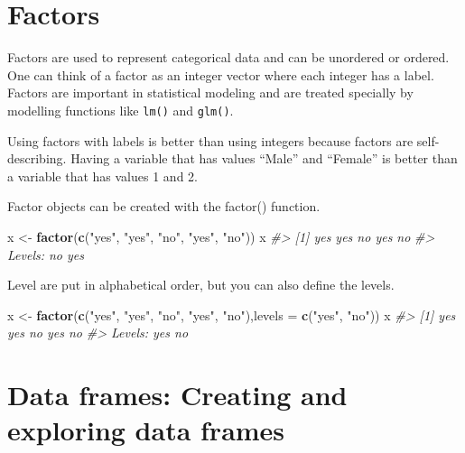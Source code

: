 \documentclass[
]{book}
\newenvironment{Shaded}{\begin{snugshade}}{\end{snugshade}}
\newcommand{\AttributeTok}[1]{\textcolor[rgb]{0.13,0.29,0.53}{#1}}
\newcommand{\CommentTok}[1]{\textcolor[rgb]{0.56,0.35,0.01}{\textit{#1}}}
\newcommand{\FunctionTok}[1]{\textcolor[rgb]{0.13,0.29,0.53}{\textbf{#1}}}
\newcommand{\NormalTok}[1]{#1}
\newcommand{\OtherTok}[1]{\textcolor[rgb]{0.56,0.35,0.01}{#1}}
\newcommand{\StringTok}[1]{\textcolor[rgb]{0.31,0.60,0.02}{#1}}
\begin{document}
\section*{Factors}\label{factors}

Factors are used to represent categorical data and can be unordered or ordered. One can think of a factor as an integer vector where each integer has a label. Factors are important in statistical modeling and are treated specially by modelling functions like \texttt{lm()} and \texttt{glm()}.

Using factors with labels is better than using integers because factors are self-describing. Having a variable that has values ``Male'' and ``Female'' is better than a variable that has values 1 and 2.

Factor objects can be created with the factor() function.

\begin{Shaded}
\begin{Highlighting}[]
\NormalTok{x }\OtherTok{\textless{}{-}} \FunctionTok{factor}\NormalTok{(}\FunctionTok{c}\NormalTok{(}\StringTok{"yes"}\NormalTok{, }\StringTok{"yes"}\NormalTok{, }\StringTok{"no"}\NormalTok{, }\StringTok{"yes"}\NormalTok{, }\StringTok{"no"}\NormalTok{)) }
\NormalTok{x}
\CommentTok{\#\textgreater{} [1] yes yes no  yes no }
\CommentTok{\#\textgreater{} Levels: no yes}
\end{Highlighting}
\end{Shaded}

Level are put in alphabetical order, but you can also define the levels.

\begin{Shaded}
\begin{Highlighting}[]
\NormalTok{x }\OtherTok{\textless{}{-}} \FunctionTok{factor}\NormalTok{(}\FunctionTok{c}\NormalTok{(}\StringTok{"yes"}\NormalTok{, }\StringTok{"yes"}\NormalTok{, }\StringTok{"no"}\NormalTok{, }\StringTok{"yes"}\NormalTok{, }\StringTok{"no"}\NormalTok{),}\AttributeTok{levels =} \FunctionTok{c}\NormalTok{(}\StringTok{"yes"}\NormalTok{, }\StringTok{"no"}\NormalTok{))}
\NormalTok{x}
\CommentTok{\#\textgreater{} [1] yes yes no  yes no }
\CommentTok{\#\textgreater{} Levels: yes no}
\end{Highlighting}
\end{Shaded}

\section*{Data frames: Creating and exploring data frames}\label{data-frames-creating-and-exploring-data-frames}
\end{document}
